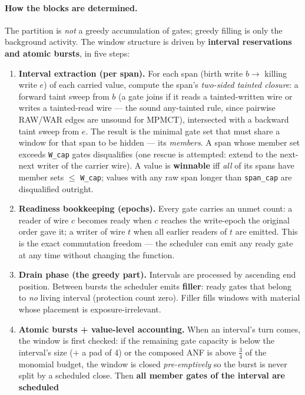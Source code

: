 \documentclass[11pt]{article}
\newcommand{\code}[1]{\texttt{#1}}
\begin{document}
\paragraph{How the blocks are determined.} The partition is \emph{not} a
greedy accumulation of gates; greedy filling is only the background
activity. The window structure is driven by \textbf{interval reservations
and atomic bursts}, in five steps:

\begin{enumerate}
\item \textbf{Interval extraction (per span).} For each span (birth write
  $b \to$ killing write $e$) of each carried value, compute the span's
  \emph{two-sided tainted closure}: a forward taint sweep from $b$ (a gate
  joins if it reads a tainted-written wire or writes a tainted-read wire
  --- the sound any-tainted rule, since pairwise RAW/WAR edges are unsound
  for MPMCT), intersected with a backward taint sweep from $e$. The result
  is the minimal gate set that must share a window for that span to be
  hidden --- its \emph{members}. A span whose member set exceeds
  \code{W\_cap} gates disqualifies (one rescue is attempted: extend to the
  next-next writer of the carrier wire). A value is \textbf{winnable} iff
  \emph{all} of its spans have member sets $\leq$ \code{W\_cap}; values
  with any raw span longer than \code{span\_cap} are disqualified outright.
\item \textbf{Readiness bookkeeping (epochs).} Every gate carries an unmet
  count: a reader of wire $c$ becomes ready when $c$ reaches the
  write-epoch the original order gave it; a writer of wire $t$ when all
  earlier readers of $t$ are emitted. This is the exact commutation
  freedom --- the scheduler can emit any ready gate at any time without
  changing the function.
\item \textbf{Drain phase (the greedy part).} Intervals are processed by
  ascending end position. Between bursts the scheduler emits
  \textbf{filler}: ready gates that belong to \emph{no} living interval
  (protection count zero). Filler fills windows with material whose
  placement is exposure-irrelevant.
\item \textbf{Atomic bursts + value-level accounting.} When an interval's
  turn comes, the window is first checked: if the remaining gate capacity
  is below the interval's size ($+$ a pad of 4) or the composed ANF is
  above $\tfrac34$ of the monomial budget, the window is closed
  \emph{pre-emptively} so the burst is never split by a scheduled close.
  Then \textbf{all member gates of the interval are scheduled
}
\end{enumerate}
\end{document}
